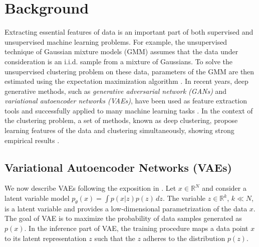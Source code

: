 \documentclass{article}
\def\R{{\mathbb R}}
\begin{document}

\section{Background}
Extracting essential features of data is an important part of both supervised and unsupervised machine learning problems. For example, the unsupervised technique of Gaussian mixture models (GMM) assumes that the data under consideration is an i.i.d. sample from a mixture of Gaussians. To solve the unsupervised clustering problem on these data, parameters of the GMM are then estimated using the expectation maximization algorithm \cite{Murphy2012_Machine}. In recent years, deep generative methods, such as \emph{generative adversarial network (GANs)} and \emph{variational autoencoder networks (VAEs)}, have been used as feature extraction tools and successfully applied to many machine learning tasks \cite{ehsan2017infinite,makhzani2015adversarial}. In the context of the clustering problem, a set of methods, known as deep clustering, propose learning features of the data and clustering simultaneously, showing strong empirical results \cite{tian2014learning,song2013auto,xie2016unsupervised,jiang2017variational}. 
\subsection{Variational Autoencoder Networks (VAEs)}


We now describe VAEs following the exposition in \cite{yang2018geodesic}. Let $x \in \R^N $ and consider a latent variable model $p_{\theta}(x) = \int p(x|z)p(z)\,dz$. The variable $z\in \R^{k}$, $k\ll N$, is a latent variable and provides a low-dimensional parametrization of the data $x$. The goal of VAE is to maximize the probability of  data samples generated as $p(x)$. In the inference part of VAE, the training procedure maps a data point $x$  to its latent representation $z$ such that the $z$ adheres to the distribution $p(z)$. 
\end{document}
